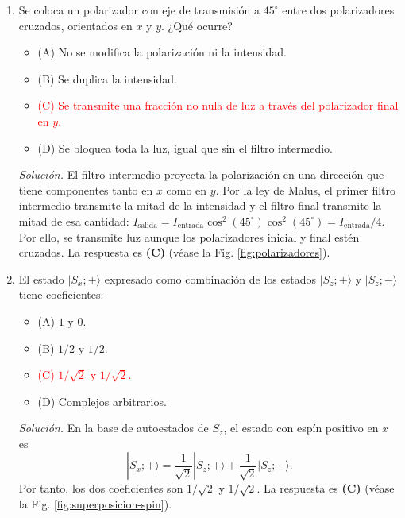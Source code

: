 \documentclass[11pt]{article}
\begin{document}
\begin{enumerate}
    \item Se coloca un polarizador con eje de transmisión a $45^\circ$ entre dos polarizadores cruzados, orientados en $x$ y $y$. ¿Qué ocurre?
    \begin{itemize}
        \item (A) No se modifica la polarización ni la intensidad.
        \item (B) Se duplica la intensidad.
        \item \textcolor{red}{(C) Se transmite una fracción no nula de luz a través del polarizador final en $y$.}
        \item (D) Se bloquea toda la luz, igual que sin el filtro intermedio.
    \end{itemize}
    \textit{Solución.} El filtro intermedio proyecta la polarización en una dirección que tiene componentes tanto en $x$ como en $y$. Por la ley de Malus, el primer filtro intermedio transmite la mitad de la intensidad y el filtro final transmite la mitad de esa cantidad: $I_{\mathrm{salida}}=I_{\mathrm{entrada}}\cos^2(45^\circ)\cos^2(45^\circ)=I_{\mathrm{entrada}}/4$. Por ello, se transmite luz aunque los polarizadores inicial y final estén cruzados. La respuesta es \textbf{(C)} (véase la Fig. \ref{fig:polarizadores}). \parencite[Sec. 18.2.2, pp. 588--592]{chaparro2026}
    

    \item El estado $|S_x;+\rangle$ expresado como combinación de los estados $|S_z;+\rangle$ y $|S_z;-\rangle$ tiene coeficientes:
    \begin{itemize}
        \item (A) $1$ y $0$.
        \item (B) $1/2$ y $1/2$.
        \item \textcolor{red}{(C) $1/\sqrt{2}$ y $1/\sqrt{2}$.}
        \item (D) Complejos arbitrarios.
    \end{itemize}
    \textit{Solución.} En la base de autoestados de $S_z$, el estado con espín positivo en $x$ es
    \[
        |S_x;+\rangle=\frac{1}{\sqrt{2}}|S_z;+\rangle+\frac{1}{\sqrt{2}}|S_z;-\rangle.
    \]
    Por tanto, los dos coeficientes son $1/\sqrt{2}$ y $1/\sqrt{2}$. La respuesta es \textbf{(C)} (véase la Fig. \ref{fig:superposicion-spin}). \parencite[Sec. 18.2.3, pp. 594--595]{chaparro2026}
    
\end{enumerate}

\printbibliography[title={Referencias}]
\end{document}
